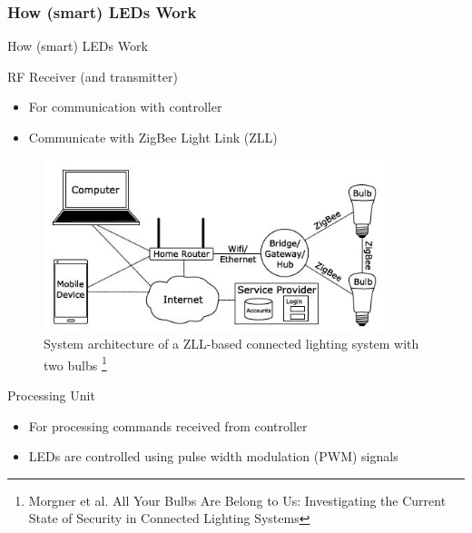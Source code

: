 \documentclass[11pt,t,usepdftitle=false,aspectratio=169]{beamer}
\begin{document}
\subsubsection{How (smart) LEDs Work}%
\label{sub:how_smart_leds_work}
\begin{frame}{How (smart) LEDs Work}
     {
        \begin{block}{RF Receiver (and transmitter)}
            \begin{itemize}
                \item For communication with controller
								\item Communicate with ZigBee Light Link (ZLL)~\cite{Ronen:2018:IGNCZCR}
            \end{itemize}
        \end{block}
    }
     {
         \begin{figure}
            \centering
            \includegraphics[height=5cm,keepaspectratio]{img/ZLL.JPG}
            \caption{\small{System architecture of a ZLL-based connected lighting system with two bulbs} \footnote{\tiny{Morgner et al. All Your Bulbs Are Belong to Us: Investigating the Current State of Security in Connected Lighting Systems}}}
         \end{figure}
    }
     {
        \begin{block}{Processing Unit}
            \begin{itemize}
                \item For processing commands received from controller
								\item LEDs are controlled using pulse width modulation (PWM) signals~\cite{Yu:2014:BCDRCVLOS,Elgala:2007:OVLWCBoWL}
            \end{itemize}
        \end{block}
        
}
\end{frame}
\end{document}
